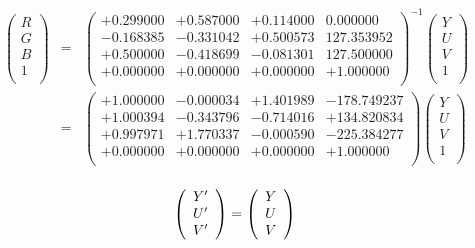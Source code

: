 \documentclass{article}
\begin{document}
\begin{eqnarray*} \left( \begin{array}{l} R \\ G \\ B \\ 1 \\ \end{array} \right) &=& \left( \begin{array}{llll} +0.299000 & +0.587000 & +0.114000 & 0.000000 \\ -0.168385 & -0.331042 & +0.500573 & 127.353952 \\ +0.500000 & -0.418699 & -0.081301 & 127.500000 \\ +0.000000 & +0.000000 & +0.000000 & +1.000000 \\ \end{array} \right)^{-1} \left( \begin{array}{l} Y \\ U \\ V \\ 1 \\ \end{array} \right) \\ &=& \left( \begin{array}{llll} +1.000000 & -0.000034 & +1.401989 & -178.749237 \\ +1.000394 & -0.343796 & -0.714016 & +134.820834 \\ +0.997971 & +1.770337 & -0.000590 & -225.384277 \\ +0.000000 & +0.000000 & +0.000000 & +1.000000 \\ \end{array} \right) \left( \begin{array}{l} Y \\ U \\ V \\ 1 \\ \end{array} \right) \\ \end{eqnarray*}
\pagebreak

\[ \left( \begin{array}{l} Y' \\ U' \\ V' \\ \end{array} \right) = \left( \begin{array}{l} Y \\ U \\ V \\ \end{array} \right) \\ \]
\pagebreak
\end{document}
